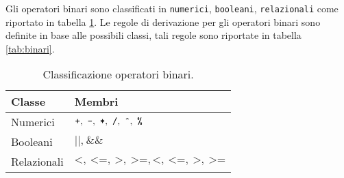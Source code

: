 \begin{table}[]
\caption{Regole di derivazione per gli operatori unari.}
\label{tab:unari}
\end{table}

Gli operatori binari sono classificati in \texttt{numerici}, \texttt{booleani}, \texttt{relazionali} come riportato in tabella \ref{tab:tipoOpBinari}. Le regole di derivazione per gli operatori binari sono definite in base alle possibili classi, tali regole sono riportate in tabella \ref{tab:binari}.

\begin{table}[]
\begin{tabular}{l|l}
Classe & Membri \\ \hline
Numerici & $\texttt{+},\ \texttt{-},\ \texttt{*},\ \texttt{/},\ \texttt{\^{}},\ \texttt{\%}$\\
Booleani & $\texttt{||},\ \texttt{\&\&}$ \\
Relazionali &$\texttt{<},\ \texttt{<=},\ \texttt{>},\ \texttt{>=} , \texttt{<},\ \texttt{<=},\ \texttt{>},\ \texttt{>=} $ \\
\end{tabular}
\caption{Classificazione operatori binari.}
\label{tab:tipoOpBinari}
\end{table}

\begin{table}[]
\caption{Regole di derivazione per gli operatori binari.}
\label{tab:binari}
\end{table}

